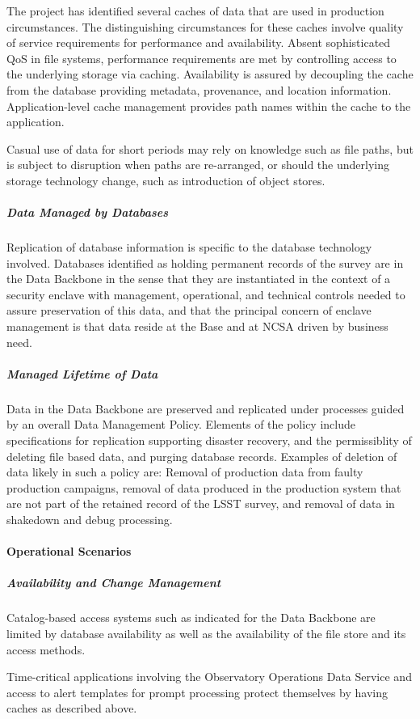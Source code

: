 The project has identified several caches of data that are used in production circumstances.
The distinguishing circumstances for these caches involve quality of service requirements for
performance and availability. Absent sophisticated QoS in file systems, performance requirements
are met by controlling access to the underlying storage via caching. Availability is assured by
decoupling the cache from the database providing metadata, provenance, and location information.
Application-level cache management provides path names within the cache to the application.

Casual use of data for short periods may rely on knowledge such as file paths, but is subject
to disruption when paths are re-arranged, or should the underlying storage technology change,
such as introduction of object stores.


\subparagraph{Data Managed by Databases}

Replication of database information is specific to the database technology involved.
Databases identified as holding permanent records of the survey are in the Data Backbone
in the sense that they are instantiated in the context of a security enclave with management,
operational, and technical controls needed to assure preservation of this data, and that the
principal concern of enclave management is that data reside at the Base and at NCSA
driven by business need.

\subparagraph{Managed Lifetime of Data}
Data in the Data Backbone are preserved and replicated under processes
guided by an overall Data Management Policy.  Elements of the policy
include specifications for replication supporting disaster recovery,
and the permissiblity of deleting file based data, and purging
database records.  Examples of deletion of data likely in such a
policy are: Removal of production data from faulty production campaigns,
removal of data produced in the production system that are not part
of the retained record of the LSST survey, and removal of data in
shakedown and debug processing.

\paragraph{Operational Scenarios}

\subparagraph{Availability and Change Management}

Catalog-based access systems such as indicated for the Data Backbone are
limited by database availability as well as the availability of the file
store and its access methods.

Time-critical applications involving the Observatory Operations Data
Service and access to alert templates for prompt processing protect
themselves by having caches as described above.
